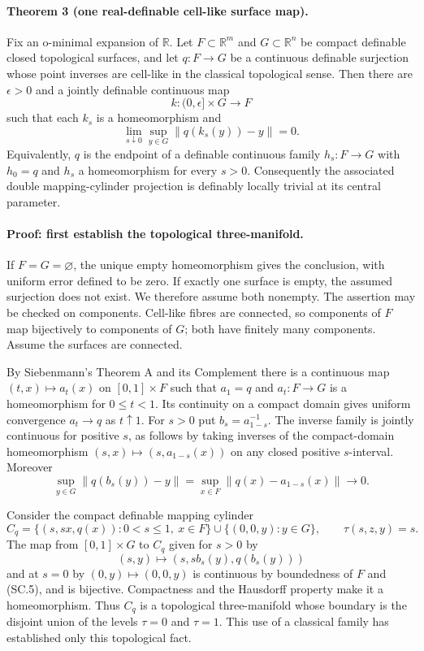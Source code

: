 \paragraph{Theorem 3 (one real-definable cell-like surface map).}
Fix an o-minimal expansion of $\mathbb R$. Let $F\subset\mathbb R^m$ and
$G\subset\mathbb R^n$ be compact definable closed topological surfaces,
and let $q:F\to G$ be a continuous definable surjection whose point inverses
are cell-like in the classical topological sense. Then there are
$\epsilon>0$ and a jointly definable continuous map
\[
 k:(0,\epsilon]\times G\longrightarrow F
\]
such that each $k_s$ is a homeomorphism and
\[
 \lim_{s\downarrow0}\sup_{y\in G}\|q(k_s(y))-y\|=0.
 \tag{SC.4}
\]
Equivalently, $q$ is the endpoint of a definable continuous family
$h_s:F\to G$ with $h_0=q$ and $h_s$ a homeomorphism for every $s>0$.
Consequently the associated double mapping-cylinder projection is definably
locally trivial at its central parameter.

\paragraph{Proof: first establish the topological three-manifold.}
If $F=G=\varnothing$, the unique empty homeomorphism gives the conclusion,
with uniform error defined to be zero. If exactly one surface is empty,
the assumed surjection does not exist. We therefore assume both nonempty.
The assertion may be checked on components. Cell-like fibres are connected,
so components of $F$ map bijectively to components of $G$; both have finitely
many components. Assume the surfaces are connected.

By Siebenmann's Theorem A and its Complement there is a continuous map
$(t,x)\mapsto a_t(x)$ on $[0,1]\times F$ such that $a_1=q$ and
$a_t:F\to G$ is a homeomorphism for $0\le t<1$. Its continuity on a compact
domain gives uniform convergence $a_t\to q$ as $t\uparrow1$. For $s>0$ put
$b_s=a_{1-s}^{-1}$. The inverse family is jointly continuous for positive
$s$, as follows by taking inverses of the compact-domain homeomorphism
$(s,x)\mapsto(s,a_{1-s}(x))$ on any closed positive $s$-interval. Moreover
\[
 \sup_{y\in G}\|q(b_s(y))-y\|
 =\sup_{x\in F}\|q(x)-a_{1-s}(x)\|\longrightarrow0.
 \tag{SC.5}
\]

Consider the compact definable mapping cylinder
\[
 C_q=\{(s,sx,q(x)):0<s\le1,\ x\in F\}
       \cup\{(0,0,y):y\in G\},\qquad \tau(s,z,y)=s.
 \tag{SC.6}
\]
The map from $[0,1]\times G$ to $C_q$ given for $s>0$ by
\[
 (s,y)\longmapsto(s,sb_s(y),q(b_s(y)))
\]
and at $s=0$ by $(0,y)\mapsto(0,0,y)$ is continuous by boundedness of
$F$ and (SC.5), and is bijective. Compactness and the Hausdorff property
make it a homeomorphism. Thus $C_q$ is a topological three-manifold whose
boundary is the disjoint union of the levels $\tau=0$ and $\tau=1$.
This use of a classical family has established only this topological fact.

